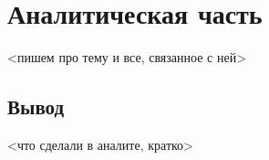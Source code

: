 \chapter{Аналитическая часть}

<пишем про тему и все, связанное с ней>

\section*{Вывод}

<что сделали в аналите, кратко>

\clearpage
